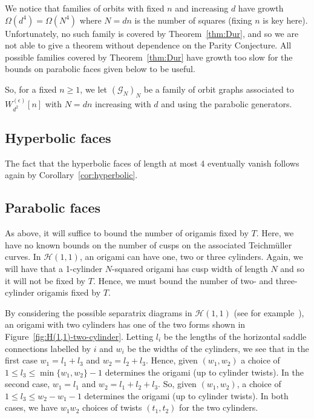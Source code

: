\documentclass[a4paper,11pt]{amsart}
\numberwithin{equation}{section}
\numberwithin{figure}{section}
\numberwithin{table}{section}
\newcommand{\teichmuller}{Teichm{\"u}ller }
\newcommand{\calH}{\mathcal{H}}
\begin{document}
We notice that families of orbits with fixed $n$ and increasing $d$ have growth $\Omega(d^{4}) = \Omega(N^4)$ where $N=dn$ is the number of squares (fixing $n$ is key here). Unfortunately, no such family is covered by Theorem~\ref{thm:Dur}, and so we are not able to give a theorem without dependence on the Parity Conjecture. All possible families covered by Theorem~\ref{thm:Dur} have growth too slow for the bounds on parabolic faces given below to be useful.

So, for a fixed $n\geq 1$, we let $(\mathcal{G}_{N})_{N}$ be a family of orbit graphs associated to $W_{d^{2}}^{(\epsilon)}[n]$ with $N = dn$ increasing with $d$ and using the parabolic generators.


\subsection{Hyperbolic faces}

The fact that the hyperbolic faces of length at most 4 eventually vanish follows again by Corollary~\ref{cor:hyperbolic}.


\subsection{Parabolic faces}\label{subsec:H(1,1)-paras}

As above, it will suffice to bound the number of origamis fixed by $T$. Here, we have no known bounds on the number of cusps on the associated \teichmuller curves. In $\calH(1,1)$, an origami can have one, two or three cylinders. Again, we will have that a 1-cylinder $N$-squared origami has cusp width of length $N$ and so it will not be fixed by $T$. Hence, we must bound the number of two- and three-cylinder origamis fixed by $T$.

By considering the possible separatrix diagrams in $\calH(1,1)$ (see for example~\cite[\S 3]{Shr}), an origami with two cylinders has one of the two forms shown in Figure~\ref{fig:H(1,1)-two-cylinder}. Letting $l_i$ be the lengths of the horizontal saddle connections labelled by $i$ and $w_{i}$ be the widths of the cylinders, we see that in the first case $w_{1} = l_1+l_3$ and $w_{2} = l_2+l_3$. Hence, given $(w_1,w_2)$ a choice of $1\leq l_3\leq \min\{w_1,w_2\}-1$ determines the origami (up to cylinder twists). In the second case, $w_1 = l_1$ and $w_2 = l_1+l_2+l_3$. So, given $(w_1,w_2)$, a choice of $1\leq l_3\leq w_2-w_1-1$ determines the origami (up to cylinder twists). In both cases, we have $w_1w_2$ choices of twists $(t_1,t_2)$ for the two cylinders.
\end{document}
